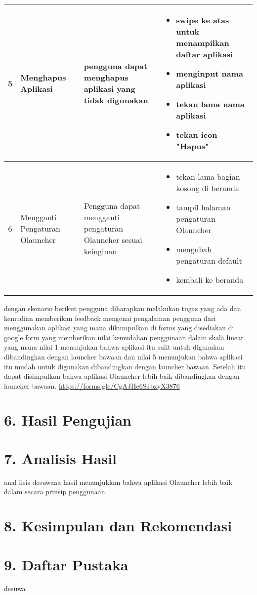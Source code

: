 \documentclass[a4paper, 12pt]{article}
\begin{document}
\begin{table}[H]
  \begin{tabularx}{\textwidth}{|c|X|X|X|}
  \hline
  5 & Menghapus Aplikasi & pengguna dapat menghapus aplikasi yang tidak digunakan & \begin{itemize}
    \item swipe ke atas untuk menampilkan daftar aplikasi
    \item menginput nama aplikasi
    \item tekan lama nama aplikasi
    \item tekan icon "Hapus"
  \end{itemize} \\
  \hline
    6 & Mengganti Pengaturan Olauncher & Pengguna dapat mengganti pengaturan Olauncher sesuai keinginan & \begin{itemize}
      \item tekan lama bagian kosong di beranda
      \item tampil halaman pengaturan Olauncher
      \item mengubah pengaturan default
      \item kembali ke beranda
    \end{itemize} \\
  \hline
\end{tabularx}
\end{table}
dengan skenario berikut pengguna diharapkan melakukan tugas yang ada dan kemudian memberikan feedback mengenai pengalaman pengguna dari menggunakan aplikasi yang mana dikumpulkan di forms yang disediakan di google form yang memberikan nilai kemudahan penggunaan dalam skala linear yang mana nilai 1 menunjukan bahwa aplikasi itu sulit untuk digunakan dibandingkan dengan launcher bawaan dan nilai 5 menunjukan bahwa aplikasi itu mudah untuk digunakan dibandingkan dengan launcher bawaan. Setelah itu dapat disimpulkan bahwa aplikasi Olauncher lebih baik dibandingkan dengan launcher bawaan.
\url{https://forms.gle/CgAJHc6SJbzyX3876}
\section*{6. Hasil Pengujian}

\section*{7. Analisis Hasil}
anal lisis desuwaaa
hasil menunjukkan bahwa aplikasi Olauncher lebih baik dalam secara prinsip penggunaan
\section*{8. Kesimpulan dan Rekomendasi}
\section*{9. Daftar Pustaka}
desuwa
\end{document}
